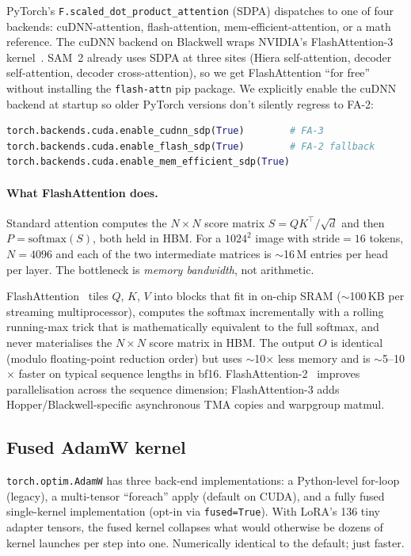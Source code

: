 \documentclass[11pt,a4paper]{article}
\begin{document}
PyTorch's \texttt{F.scaled\_dot\_product\_attention} (SDPA) dispatches to
one of four backends: cuDNN-attention, flash-attention,
mem-efficient-attention, or a math reference. The cuDNN backend on
Blackwell wraps NVIDIA's FlashAttention-3 kernel~\cite{flashattn3}.
SAM~2 already uses SDPA at three sites (Hiera self-attention, decoder
self-attention, decoder cross-attention), so we get FlashAttention
``for free'' without installing the \texttt{flash-attn} pip package.
We explicitly enable the cuDNN backend at startup so older PyTorch
versions don't silently regress to FA-2:
\begin{lstlisting}[language=Python]
torch.backends.cuda.enable_cudnn_sdp(True)        # FA-3
torch.backends.cuda.enable_flash_sdp(True)        # FA-2 fallback
torch.backends.cuda.enable_mem_efficient_sdp(True)
\end{lstlisting}

\paragraph{What FlashAttention does.} Standard attention computes the
$N{\times}N$ score matrix $S = QK^\top / \sqrt{d}$ and then
$P = \mathrm{softmax}(S)$, both held in HBM. For a $1024^2$ image with
$\mathrm{stride}=16$ tokens, $N=4096$ and each of the two intermediate
matrices is $\sim$16\,M entries per head per layer. The bottleneck is
\emph{memory bandwidth}, not arithmetic.

FlashAttention~\cite{flashattn} tiles $Q$, $K$, $V$ into blocks that
fit in on-chip SRAM ($\sim$100\,KB per streaming multiprocessor),
computes the softmax incrementally with a rolling running-max trick
that is mathematically equivalent to the full softmax, and never
materialises the $N{\times}N$ score matrix in HBM. The output $O$ is
identical (modulo floating-point reduction order) but uses
$\sim$10$\times$ less memory and is $\sim$5--10$\times$ faster on
typical sequence lengths in bf16. FlashAttention-2~\cite{flashattn2}
improves parallelisation across the sequence dimension; FlashAttention-3
adds Hopper/Blackwell-specific asynchronous TMA copies and warpgroup
matmul.

\subsection{Fused AdamW kernel}

\texttt{torch.optim.AdamW} has three back-end implementations: a
Python-level for-loop (legacy), a multi-tensor ``foreach'' apply
(default on CUDA), and a fully fused single-kernel implementation
(opt-in via \texttt{fused=True}). With LoRA's 136 tiny adapter
tensors, the fused kernel collapses what would otherwise be dozens of
kernel launches per step into one. Numerically identical to the
default; just faster.
\end{document}
